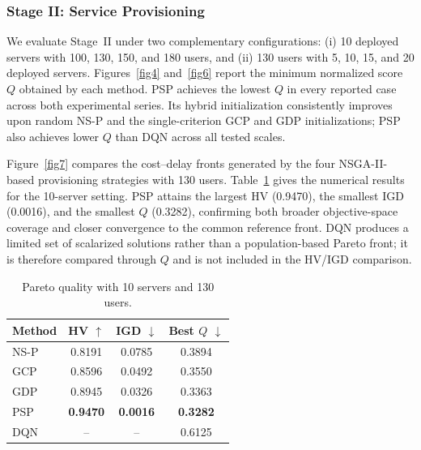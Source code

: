 \documentclass[10pt, conference, letterpaper]{IEEEtran}
\newif\ifshowrevisions
\newenvironment{revision}{\begingroup\color{blue}}{\endgroup}
\newenvironment{revision}{\begingroup}{\endgroup}
\newcommand{\revcolor}{\ifshowrevisions\color{blue}\fi}
\begin{document}
\subsubsection{Stage II: Service Provisioning}
\begin{revision}
We evaluate Stage~II under two complementary configurations: (i) 10 deployed servers with 100, 130, 150, and 180 users, and (ii) 130 users with 5, 10, 15, and 20 deployed servers. Figures~\ref{fig4} and~\ref{fig6} report the minimum normalized score $Q$ obtained by each method. PSP achieves the lowest $Q$ in every reported case across both experimental series. Its hybrid initialization consistently improves upon random NS-P and the single-criterion GCP and GDP initializations; PSP also achieves lower $Q$ than DQN across all tested scales.

Figure~\ref{fig7} compares the cost--delay fronts generated by the four NSGA-II-based provisioning strategies with 130 users. Table~\ref{tab:pareto_metrics} gives the numerical results for the 10-server setting. PSP attains the largest HV (0.9470), the smallest IGD (0.0016), and the smallest $Q$ (0.3282), confirming both broader objective-space coverage and closer convergence to the common reference front. DQN produces a limited set of scalarized solutions rather than a population-based Pareto front; it is therefore compared through $Q$ and is not included in the HV/IGD comparison.
\end{revision}

\begin{table}[!t]
\centering
\revcolor
\caption{Pareto quality with 10 servers and 130 users.}
\label{tab:pareto_metrics}
\small
\begin{tabular}{|l|c|c|c|}
\hline
Method & HV $\uparrow$ & IGD $\downarrow$ & Best $Q$ $\downarrow$ \\ \hline
NS-P & 0.8191 & 0.0785 & 0.3894 \\ \hline
GCP  & 0.8596 & 0.0492 & 0.3550 \\ \hline
GDP  & 0.8945 & 0.0326 & 0.3363 \\ \hline
PSP  & \textbf{0.9470} & \textbf{0.0016} & \textbf{0.3282} \\ \hline
DQN  & -- & -- & 0.6125 \\ \hline
\end{tabular}
\end{table}
\end{document}
